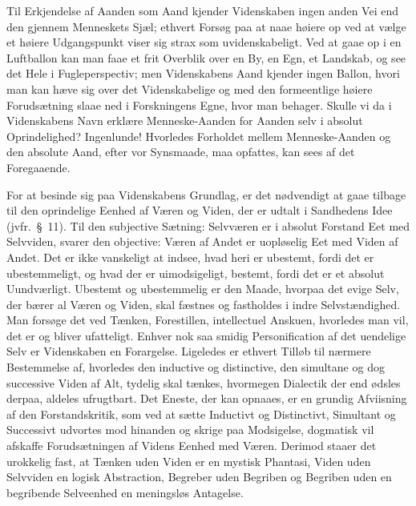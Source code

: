 \documentclass[12pt]{book}
\newcommand{\apage}[1]{\marginnote{\footnotesize\textit{[#1]}}}
\begin{document}
Til Erkjendelse af Aanden som Aand kjender Videnskaben ingen anden Vei end
den gjennem Menneskets Sjæl; ethvert Forsøg paa at naae høiere op ved at
vælge et høiere Udgangspunkt viser sig strax som uvidenskabeligt. Ved at
gaae op i en Luftballon kan man faae et frit Overblik over en By, en Egn,
et Landskab, og see det Hele i Fugleperspectiv; men Videnskabens Aand
kjender ingen Ballon, hvori man kan hæve sig over det Videnskabelige og med
den formeentlige høiere Forudsætning slaae ned i Forskningens Egne, hvor man
behager. Skulle vi da i Videnskabens Navn erklære Menneske-Aanden for
Aanden selv i absolut Oprindelighed? Ingenlunde! Hvorledes Forholdet mellem
Menneske-Aanden og den absolute Aand, efter vor Synsmaade, maa opfattes,
kan sees af det Foregaaende.

For at besinde sig paa Videnskabens Grundlag, er det nødvendigt at gaae
tilbage til den oprindelige Eenhed af Væren og Viden, der er udtalt i
Sandhedens Idee (jvfr.\ §\ 11). Til den subjective Sætning: Selvværen er i
absolut Forstand Eet med Selvviden, svarer den \apage{218} objective: Væren af Andet er
uopløselig Eet med Viden af Andet. Det er ikke vanskeligt at indsee, hvad
heri er ubestemt, fordi det er ubestemmeligt, og hvad der er uimodsigeligt,
bestemt, fordi det er et absolut Uundværligt. Ubestemt og ubestemmelig er
den Maade, hvorpaa det evige Selv, der bærer al Væren og Viden, skal fæstnes
og fastholdes i indre Selvstændighed. Man forsøge det ved Tænken,
Forestillen, intellectuel Anskuen, hvorledes man vil, det er og bliver
ufatteligt. Enhver nok saa smidig Personification af det uendelige Selv er
Videnskaben en Forargelse. Ligeledes er ethvert Tilløb til nærmere
Bestemmelse af, hvorledes den inductive og distinctive, den simultane og
dog successive Viden af Alt, tydelig skal tænkes, hvormegen Dialectik der
end ødsles derpaa, aldeles ufrugtbart. Det Eneste, der kan opnaaes, er en
grundig Afviisning af den Forstandskritik, som ved at sætte Inductivt og
Distinctivt, Simultant og Successivt udvortes mod hinanden og skrige paa
Modsigelse, dogmatisk vil afskaffe Forudsætningen af Videns Eenhed med
Væren. Derimod staaer det urokkelig fast, at Tænken uden Viden er en
mystisk Phantasi, Viden uden Selvviden en logisk Abstraction, Begreber uden
Begriben og Begriben uden en begribende Selveenhed en meningsløs Antagelse.
\end{document}
